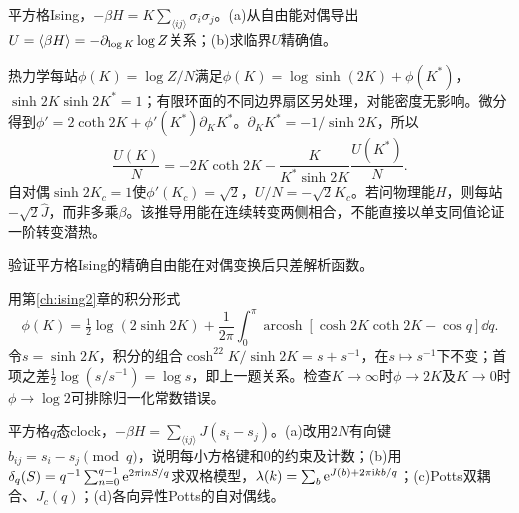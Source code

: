 \begin{exercise}[原题1(a),(b)]\label{p:334-5-1}
平方格Ising，$-\beta H=K\sum_{\langle ij\rangle}\sigma_i\sigma_j$。(a)从自由能对偶导出$U=\langle \beta H\rangle=-\partial_{\log K}\log Z$关系；(b)求临界$U$精确值。
\end{exercise}
\begin{solution}
热力学每站$\phi(K)=\log Z/N$满足$\phi(K)=\log\sinh(2K)+\phi(K^*)$，$\sinh2K\sinh2K^*=1$；有限环面的不同边界扇区另处理，对能密度无影响。微分得到$\phi'=2\coth2K+\phi'(K^*)\partial_KK^*$。$\partial_KK^*=-1/\sinh2K$，所以
\begin{equation}
\frac{U(K)}N=-2K\coth2K-\frac{K}{K^*\sinh2K}\frac{U(K^*)}N.
\end{equation}
自对偶$\sinh2K_c=1$使$\phi'(K_c)=\sqrt2$，$U/N=-\sqrt2K_c$。若问物理能$H$，则每站$-\sqrt2\widehat J$，而非多乘$\beta$。该推导用能在连续转变两侧相合，不能直接以单支同值论证一阶转变潜热。
\end{solution}
\begin{exercise}[原题2，选做]\label{p:334-5-2}
验证平方格Ising的精确自由能在对偶变换后只差解析函数。
\end{exercise}
\begin{solution}
用第\ref{ch:ising2}章的积分形式
\begin{equation}
\phi(K)=\tfrac12\log(2\sinh2K)+\frac1{2\pi}\int_0^\pi\operatorname{arcosh}[\cosh2K\coth2K-\cos q]\dd q.
\end{equation}
令$s=\sinh2K$，积分的组合$\cosh^22K/\sinh2K=s+s^{-1}$，在$s\mapsto s^{-1}$下不变；首项之差$\tfrac12\log(s/s^{-1})=\log s$，即上一题关系。检查$K\to\infty$时$\phi\to2K$及$K\to0$时$\phi\to\log2$可排除归一化常数错误。
\end{solution}
\begin{exercise}[原题3(a)--(d)]\label{p:334-5-3}
平方格$q$态clock，$-\beta H=\sum_{\langle ij\rangle}J(s_i-s_j)$。(a)改用$2N$有向键$b_{ij}=s_i-s_j\pmod q$，说明每小方格键和0的约束及计数；(b)用$\delta_q(S)=q^{-1}\sum_{n=0}^{q-1}\mathrm e^{2\pi\mathrm i nS/q}$求双格模型，$\lambda(k)=\sum_b\mathrm e^{J(b)+2\pi\mathrm i kb/q}$；(c)Potts双耦合、$J_c(q)$；(d)各向异性Potts的自对偶线。
\end{exercise}
